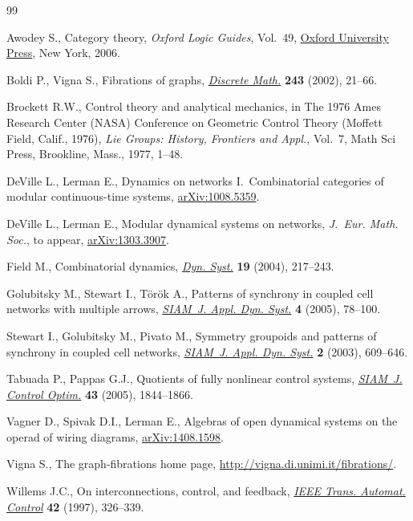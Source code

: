 \documentclass[pdftex]{sigma}
\numberwithin{equation}{section}
\begin{document}
\begin{thebibliography}{99}
\footnotesize \itemsep=0pt

Awodey S., Category theory, \textit{Oxford Logic Guides}, Vol.~49, \href{http://dx.doi.org/10.1093/acprof:oso/9780198568612.001.0001}{Oxford University Press}, New York, 2006.

Boldi P., Vigna S., Fibrations of graphs, \href{http://dx.doi.org/10.1016/S0012-365X(00)00455-6}{\textit{Discrete Math.}} \textbf{243}
  (2002), 21--66.

Brockett R.W., Control theory and analytical mechanics, in The 1976 {A}mes
  {R}esearch {C}enter ({NASA}) {C}onference on {G}eometric {C}ontrol {T}heory
  ({M}of\/fett {F}ield, {C}alif., 1976), \textit{Lie Groups: History, Frontiers
  and Appl.}, Vol.~7, Math Sci Press, Brookline, Mass., 1977, 1--48.

DeVille L., Lerman E., Dynamics on networks I.~Combinatorial categories of
  modular continuous-time systems, \href{http://arxiv.org/abs/1008.5359}{arXiv:1008.5359}.

DeVille L., Lerman E., Modular dynamical systems on networks, \textit{J.~Eur.
  Math. Soc.}, {t}o appear, \href{http://arxiv.org/abs/1303.3907}{arXiv:1303.3907}.

Field M., Combinatorial dynamics, \href{http://dx.doi.org/10.1080/14689360410001729379}{\textit{Dyn. Syst.}} \textbf{19} (2004),
  217--243.

Golubitsky M., Stewart I., T{\"o}r{\"o}k A., Patterns of synchrony in coupled
  cell networks with multiple arrows, \href{http://dx.doi.org/10.1137/040612634}{\textit{SIAM~J. Appl. Dyn. Syst.}}
  \textbf{4} (2005), 78--100.

Stewart I., Golubitsky M., Pivato M., Symmetry groupoids and patterns of
  synchrony in coupled cell networks, \href{http://dx.doi.org/10.1137/S1111111103419896}{\textit{SIAM~J. Appl. Dyn. Syst.}}
  \textbf{2} (2003), 609--646.

Tabuada P., Pappas G.J., Quotients of fully nonlinear control systems,
  \href{http://dx.doi.org/10.1137/S0363012901399027}{\textit{SIAM~J. Control Optim.}} \textbf{43} (2005), 1844--1866.

Vagner D., Spivak D.I., Lerman E., Algebras of open dynamical systems on the
  operad of wiring diagrams, \href{http://arxiv.org/abs/1408.1598}{arXiv:1408.1598}.

Vigna S., The graph-fibrations home page, \url{http://vigna.di.unimi.it/fibrations/}.

Willems J.C., On interconnections, control, and feedback, \href{http://dx.doi.org/10.1109/9.557576}{\textit{IEEE Trans.
  Automat. Control}} \textbf{42} (1997), 326--339.

\end{thebibliography}\LastPageEnding
\end{document}
